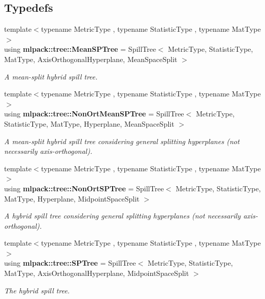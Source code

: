 \subsection*{Typedefs}
\begin{DoxyCompactItemize}
\item 
{\footnotesize template$<$typename Metric\+Type , typename Statistic\+Type , typename Mat\+Type $>$ }\\using {\bf mlpack\+::tree\+::\+Mean\+S\+P\+Tree} = Spill\+Tree$<$ Metric\+Type, Statistic\+Type, Mat\+Type, Axis\+Orthogonal\+Hyperplane, Mean\+Space\+Split $>$
\begin{DoxyCompactList}\small\item\em A mean-\/split hybrid spill tree. \end{DoxyCompactList}\item 
{\footnotesize template$<$typename Metric\+Type , typename Statistic\+Type , typename Mat\+Type $>$ }\\using {\bf mlpack\+::tree\+::\+Non\+Ort\+Mean\+S\+P\+Tree} = Spill\+Tree$<$ Metric\+Type, Statistic\+Type, Mat\+Type, Hyperplane, Mean\+Space\+Split $>$
\begin{DoxyCompactList}\small\item\em A mean-\/split hybrid spill tree considering general splitting hyperplanes (not necessarily axis-\/orthogonal). \end{DoxyCompactList}\item 
{\footnotesize template$<$typename Metric\+Type , typename Statistic\+Type , typename Mat\+Type $>$ }\\using {\bf mlpack\+::tree\+::\+Non\+Ort\+S\+P\+Tree} = Spill\+Tree$<$ Metric\+Type, Statistic\+Type, Mat\+Type, Hyperplane, Midpoint\+Space\+Split $>$
\begin{DoxyCompactList}\small\item\em A hybrid spill tree considering general splitting hyperplanes (not necessarily axis-\/orthogonal). \end{DoxyCompactList}\item 
{\footnotesize template$<$typename Metric\+Type , typename Statistic\+Type , typename Mat\+Type $>$ }\\using {\bf mlpack\+::tree\+::\+S\+P\+Tree} = Spill\+Tree$<$ Metric\+Type, Statistic\+Type, Mat\+Type, Axis\+Orthogonal\+Hyperplane, Midpoint\+Space\+Split $>$
\begin{DoxyCompactList}\small\item\em The hybrid spill tree. \end{DoxyCompactList}\end{DoxyCompactItemize}
